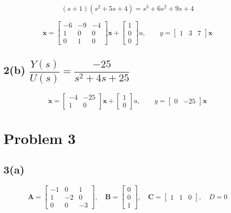 \documentclass[11pt]{article}
\newcommand{\codepair}[2]{%
  \par\noindent\begin{minipage}{\linewidth}
  
  
  \end{minipage}\par}
\begin{document}
\[
(s+1)(s^2+5s+4) = s^3 + 6s^2 + 9s + 4
\]

\codepair{matlab/p2a.m}{outputs/p2a.txt}

\[
\dot{\mathbf{x}} =
\begin{bmatrix}-6 & -9 & -4\\ 1 & 0 & 0\\ 0 & 1 & 0\end{bmatrix}\mathbf{x}
+ \begin{bmatrix}1\\ 0\\ 0\end{bmatrix} u,
\qquad
y = \begin{bmatrix}1 & 3 & 7\end{bmatrix}\mathbf{x}
\]

\subsection*{2(b) \quad $\dfrac{Y(s)}{U(s)} = \dfrac{-25}{s^2+4s+25}$}

\codepair{matlab/p2b.m}{outputs/p2b.txt}

\[
\dot{\mathbf{x}} =
\begin{bmatrix}-4 & -25\\ 1 & 0\end{bmatrix}\mathbf{x}
+ \begin{bmatrix}1\\ 0\end{bmatrix} u,
\qquad
y = \begin{bmatrix}0 & -25\end{bmatrix}\mathbf{x}
\]

\section*{Problem 3}

\subsection*{3(a)}

\[
\mathbf{A} = \begin{bmatrix}-1 & 0 & 1\\ 1 & -2 & 0\\ 0 & 0 & -3\end{bmatrix},\quad
\mathbf{B} = \begin{bmatrix}0\\ 0\\ 1\end{bmatrix},\quad
\mathbf{C} = \begin{bmatrix}1 & 1 & 0\end{bmatrix},\quad
D = 0
\]
\end{document}
